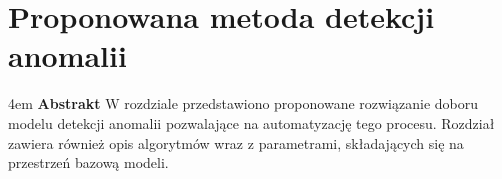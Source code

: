 \chapter{Proponowana metoda detekcji anomalii}
\begingroup
\leftskip4em
\rightskip\leftskip
\noindent
\textbf{Abstrakt} W rozdziale przedstawiono proponowane rozwiązanie doboru modelu detekcji anomalii pozwalające na automatyzację tego procesu. Rozdział zawiera również opis algorytmów wraz z parametrami, składających się na przestrzeń bazową modeli.
\par
\endgroup

